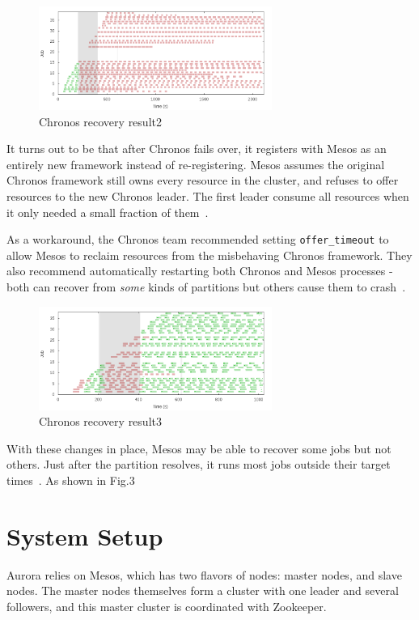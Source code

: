 \documentclass[letterpaper,twocolumn,10pt]{article}
\begin{document}
\begin{figure}
\centering
\includegraphics[width=3in]{chronos2}
\caption{Chronos recovery result2}
\label{fig:my_label}
\end{figure}

It turns out to be that after Chronos fails over, it registers with Mesos as an entirely new framework instead of re-registering. Mesos assumes the original Chronos framework still owns every resource in the cluster, and refuses to offer resources to the new Chronos leader. The first leader consume all resources when it only needed a small fraction of them~\cite{Chronos}.

As a workaround, the Chronos team recommended setting \verb|offer_timeout| to allow Mesos to reclaim resources from the misbehaving Chronos framework. They also recommend automatically restarting both Chronos and Mesos processes - both can recover from \emph{some} kinds of partitions but others cause them to crash~\cite{Chronos}.

\begin{figure}
\centering
\includegraphics[width=3in]{chronos3}
\caption{Chronos recovery result3}
\label{fig:my_label}
\end{figure}
With these changes in place, Mesos may be able to recover some jobs but not others. Just after the partition resolves, it runs most jobs outside their target times~\cite{Chronos}. As shown in Fig.3

\section{System Setup}
Aurora relies on Mesos, which has two flavors of nodes: master nodes, and slave nodes. The master nodes themselves form a cluster with one leader and several followers, and this master cluster is coordinated with Zookeeper.
\end{document}
